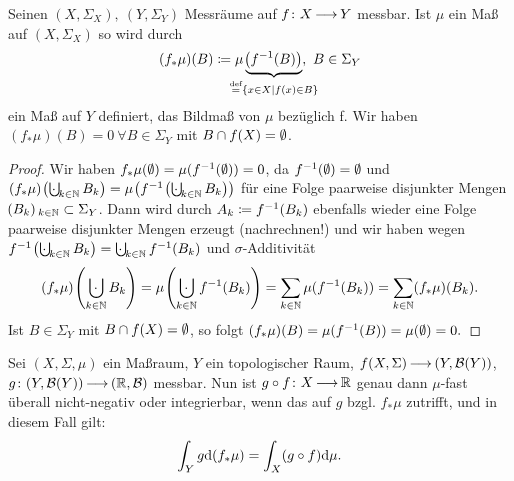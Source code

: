 \documentclass[skript.tex]{subfiles}
\begin{document}
	\begin{lem}[Bildmaß]
			Seinen $(X, \Sigma_X),\ (Y, \Sigma_Y)$ Messräume auf $f\colon X \kern -1pt \longrightarrow \kern -1pt Y$ messbar. Ist $\mu$ ein Maß auf $(X, \Sigma_X)$ so wird durch
			\[
				(f_* \mu)(B) \ceq \mu\underbrace{\pr{f^{-1} (B) }}_{\mathclap{\stackrel{\text{def}}{=} \cbr{x\in X \mid f(x) \in B}}},\ B \in \Sigma_Y
			\]
			ein Maß auf $Y$ definiert, das \textup{Bildmaß von $\mu$ bezüglich f}. Wir haben $(f_* \mu)(B) = 0\ \forall B \in \Sigma_Y$ mit $B\cap f(X) = \emptyset$.
	\end{lem}
	
	\begin{proof}
			Wir haben $f_* \mu (\emptyset) = \mu(f^{-1}(\emptyset)) = 0$, da $f^{-1}(\emptyset) = \emptyset$ und \\ $(f_* \mu) \pr{\bigcupdot_{k\in\N} B_k} = \mu\pr{f^{-1} \pr{\bigcupdot_{k\in\N} B_k}} $ für eine Folge paarweise disjunkter Mengen $\pr{B_k}_{k\in\N} \sbs \Sigma_Y$. Dann wird durch $A_k \coloneqq f^{-1} (B_k)$ ebenfalls wieder eine Folge paarweise disjunkter Mengen erzeugt (nachrechnen!) und wir haben wegen $f^{-1} \pr{\bigcupdot_{k\in\N} B_k }= \bigcupdot_{k\in\N} f^{-1} (B_k)$ und $\sigma$-Additivität
			\[
				(f_* \mu)\pr{\bigcupdot_{k\in\N} B_k} = \mu\pr{\bigcupdot_{k\in\N} f^{-1} (B_k) } = \sum_{k\in\N} \mu(f^{-1} (B_k)) = \sum_{k\in\N} (f_* \mu)(B_k).
			\]
			Ist $B \in \Sigma_Y$ mit $B\cap f(X)=\emptyset$, so folgt $(f_* \mu)(B) = \mu ( f^{-1} (B)) = \mu(\emptyset) = 0.$
	\end{proof}
	
	\begin{theorem}
		Sei $(X,\Sigma, \mu)$ ein Maßraum, $Y$ ein topologischer Raum, $f(X,\Sigma) \kern -1pt \longrightarrow \kern -1pt (Y, \mathcal{B}(Y))$,\\ $g\colon (Y, \mathcal{B}(Y)) \kern -1pt \longrightarrow \kern -1pt (\mathbb{R}, \mathcal{B})$ messbar. Nun ist $g \circ f\colon X \kern -1pt \longrightarrow \kern -1pt \mathbb{R}$ genau dann $\mu$-fast überall nicht-negativ oder integrierbar, wenn das auf $g$ bzgl. $f_* \mu$ zutrifft, und in diesem Fall gilt:
		\[
			\int_Y g \mathrm{d} (f_* \mu) = \int_X (g \circ f) \mathrm{d} \mu .
		\]
	\end{theorem}
	
\end{document}
